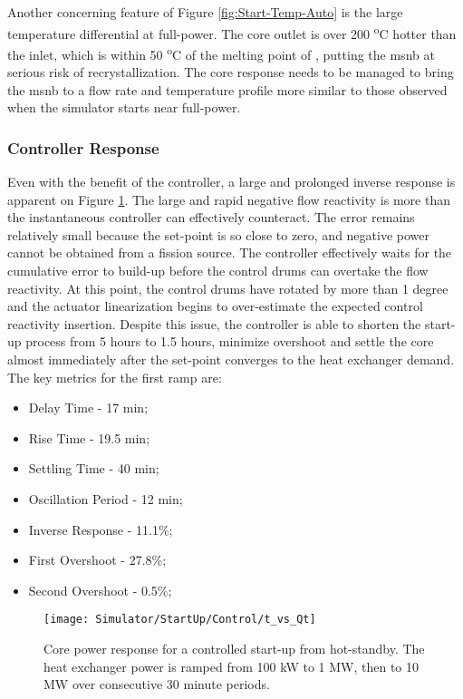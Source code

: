 Another concerning feature of Figure \ref{fig:Start-Temp-Auto} is the large temperature differential at full-power. The core outlet is over 200 \textsuperscript{o}C hotter than the inlet, which is within 50 \textsuperscript{o}C of the melting point of \flinak, putting the \acs{msnb} at serious risk of \UF recrystallization. The core response needs to be managed to bring the \acs{msnb} to a flow rate and temperature profile more similar to those observed when the simulator starts near full-power.    

\subsubsection{Controller Response}
Even with the benefit of the controller, a large and prolonged inverse response is apparent on Figure \ref{fig:Start-Power-Ctr}. The large and rapid negative flow reactivity is more than the instantaneous controller can effectively counteract. The error remains relatively small because the set-point is so close to zero, and negative power cannot be obtained from a fission source. The controller effectively waits for the cumulative error to build-up before the control drums can overtake the flow reactivity. At this point, the control drums have rotated by more than 1 degree and the actuator linearization begins to over-estimate the expected control reactivity insertion. Despite this issue, the controller is able to shorten the start-up process from 5 hours to 1.5 hours, minimize overshoot and settle the core almost immediately after the set-point converges to the heat exchanger demand. The key metrics for the first ramp are:

\begin{itemize}
    \item Delay Time - 17 min;
    \item Rise Time - 19.5 min;
    \item Settling Time - 40 min;
    \item Oscillation Period - 12 min;
    \item Inverse Response - 11.1\%;
    \item First Overshoot - 27.8\%;
    \item Second Overshoot - 0.5\%;
\end{itemize}

\begin{figure}[ht!]
    \centering
    \texttt{[image: Simulator/StartUp/Control/t\_vs\_Qt]}
    \caption[Controlled Start-Up Power Response]{Core power response for a controlled start-up from hot-standby. The heat exchanger power is ramped from 100 kW to 1 MW, then to 10 MW over consecutive 30 minute periods.}
    \label{fig:Start-Power-Ctr}
\end{figure}

